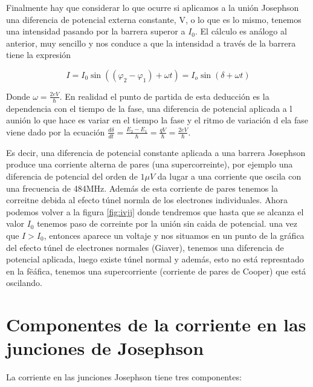 Finalmente hay que considerar lo que ocurre si aplicamos a la unión Josephson una diferencia de potencial externa constante, V, o lo que es lo mismo, tenemos una intensidad pasando por la barrera superor a $I_0$. El cálculo es análogo al anterior, muy sencillo y nos conduce a que la intensidad a través de la barrera tiene la expresión

\begin{equation}
    I = I_0 \sin( (\varphi_2 - \varphi_1) + \omega t) = I_o \sin(\delta + \omega t)
\end{equation}

Donde $\omega = \frac{2 eV}{\hbar}$. En realidad el punto de partida de esta deducción es la dependencia con el tiempo de la fase, una diferencia de potencial aplicada a l aunión lo que hace es variar en el tiempo la fase y el ritmo de variación d ela fase viene dado por la ecuación $\frac{d \delta}{d t} = \frac{E_2 - E_1}{\hbar} = \frac{qV}{\hbar} = \frac{2 eV}{\hbar}$.

Es decir, una diferencia de potencial constante aplicada a una barrera Josephson produce una corriente alterna de pares (una supercorreinte), por ejemplo una diferencia de potencial del orden de $1 \mu V$ da lugar a una corriente que oscila con una frecuencia de 484MHz. Además de esta corriente de pares tenemos la correitne debida al efecto túnel normla de los electrones individuales. Ahora podemos volver a la figura \ref{fig:ivjj} donde tendremos que hasta que se alcanza el valor $I_0$ tenemos paso de correinte por la unión sin caida de potencial. una vez que $I > I_0$, entonces aparece un voltaje y nos situamos en un punto de la gráfica del efecto túnel de electrones normales (Giaver), tenemos una diferencia de potencial aplicada, luego existe túnel normal y además, esto no está represntado en la fëáfica, tenemos una supercorriente (corriente de pares de Cooper) que está oscilando.

\section{Componentes de la corriente en las junciones de Josephson}

La corriente en las junciones Josephson tiene tres componentes:

